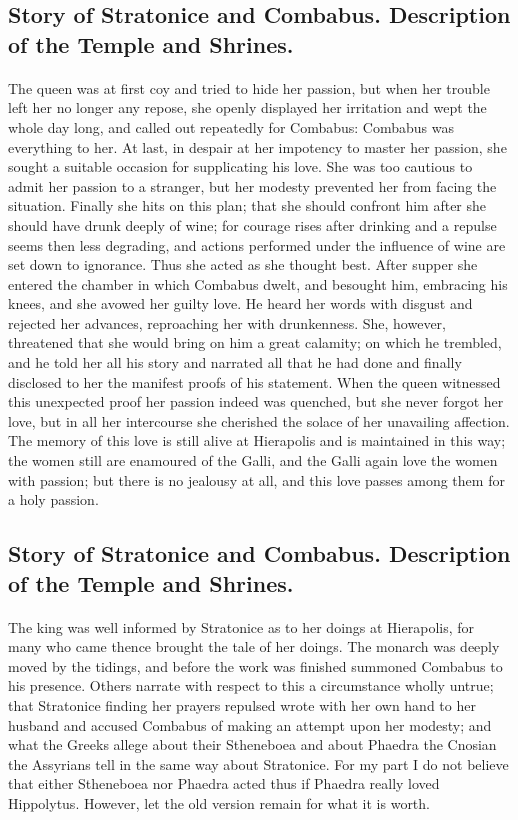 \documentclass[a4paper, 11pt, oneside, polutonikogreek, english]{article}
\begin{document}
\subsection{Story of Stratonice and Combabus. Description of the Temple and Shrines.}
\paragraph{}
The queen was at first coy and tried to hide her passion, but when her trouble left her no longer any repose, she openly displayed her irritation and wept the whole day long, and called out repeatedly for Combabus: Combabus was everything to her. At last, in despair at her impotency to master her passion, she sought a suitable occasion for supplicating his love. She was too cautious to admit her passion to a stranger, but her modesty prevented her from facing the situation. Finally she hits on this plan; that she should confront him after she should have drunk deeply of wine; for courage rises after drinking and a repulse seems then less degrading, and actions performed under the influence of wine are set down to ignorance. Thus she acted as she thought best. After supper she entered the chamber in which Combabus dwelt, and besought him, embracing his knees, and she avowed her guilty love. He heard her words with disgust and rejected her advances, reproaching her with drunkenness. She, however, threatened that she would bring on him a great calamity; on which he trembled, and he told her all his story and narrated all that he had done and finally disclosed to her the manifest proofs of his statement. When the queen witnessed this unexpected proof her passion indeed was quenched, but she never forgot her love, but in all her intercourse she cherished the solace of her unavailing affection. The memory of this love is still alive at Hierapolis and is maintained in this way; the women still are enamoured of the Galli, and the Galli again love the women with passion; but there is no jealousy at all, and this love passes among them for a holy passion.

\subsection{Story of Stratonice and Combabus. Description of the Temple and Shrines.}
\paragraph{}
The king was well informed by Stratonice as to her doings at Hierapolis, for many who came thence brought the tale of her doings. The monarch was deeply moved by the tidings, and before the work was finished summoned Combabus to his presence. Others narrate with respect to this a circumstance wholly untrue; that Stratonice finding her prayers repulsed wrote with her own hand to her husband and accused Combabus of making an attempt upon her modesty; and what the Greeks allege about their Stheneboea and about Phaedra the Cnosian the Assyrians tell in the same way about Stratonice. For my part I do not believe that either Stheneboea nor Phaedra acted thus if Phaedra really loved Hippolytus. However, let the old version remain for what it is worth.
\end{document}
